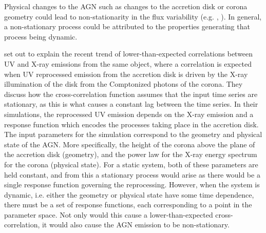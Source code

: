 \documentclass[fleqn,usenatbib]{mnras}
\begin{document}
Physical changes to the AGN such as changes to the accretion disk or corona geometry could lead to non-stationarity in the flux variability (e.g. \citealt{alston2019remarkable}, \citealt{panagiotou2022_uv_xray_correlation}). In general, a non-stationary process could be attributed to the properties generating that process being dynamic.\

\citet{panagiotou2022_uv_xray_correlation} set out to explain the recent trend of lower-than-expected correlations between UV and X-ray emissions from the same object, where a correlation is expected when UV reprocessed emission from the accretion disk is driven by the X-ray illumination of the disk from the Comptonized photons of the corona. They discuss how the cross-correlation function assumes that the input time series are stationary, as this is what causes a constant lag between the time series. In their simulations, the reprocessed UV emission depends on the X-ray emission and a response function which encodes the processes taking place in the accretion disk. The input parameters for the simulation correspond to the geometry and physical state of the AGN. More specifically, the height of the corona above the plane of the accretion disk (geometry), and the power law for the X-ray energy spectrum for the corona (physical state). For a static system, both of these parameters are held constant, and from this a stationary process would arise as there would be a single response function governing the reprocessing. However, when the system is dynamic, i.e. either the geometry or physical state have some time dependence, there must be a set of response functions, each corresponding to a point in the parameter space. Not only would this cause a lower-than-expected cross-correlation, it would also cause the AGN emission to be non-stationary.
\end{document}
